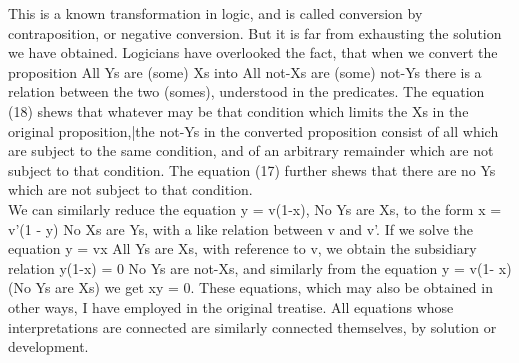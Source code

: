 \documentclass{article}
\begin{document}
{{{{This is a known transformation in logic, and is called conversion by contraposition,
or negative conversion. But it is far from exhausting the solution we
have obtained. Logicians have overlooked the fact, that when we convert the
proposition All Ys are (some) Xs into All not-Xs are (some) not-Ys there is a
relation between the two (somes), understood in the predicates. The equation
(18) shews that whatever may be that condition which limits the Xs in the original
proposition,|the not-Ys in the converted proposition consist of all which
are subject to the same condition, and of an arbitrary remainder which are not
subject to that condition. The equation (17) further shews that there are no Ys
which are not subject to that condition.\vspace{.1in}\\
\hspace{.2in} We can similarly reduce the equation y = v(1-x), No Ys are Xs, to the form
x = v'(1 - y) No Xs are Ys, with a like relation between v and v'. If we solve
the equation y = vx All Ys are Xs, with reference to v, we obtain the subsidiary
relation y(1-x) = 0 No Ys are not-Xs, and similarly from the equation y = v(1-
x) (No Ys are Xs) we get xy = 0. These equations, which may also be obtained
in other ways, I have employed in the original treatise. All equations whose
interpretations are connected are similarly connected themselves, by solution or
development.\vspace{.1in}\\

}}}}
\end{document}
